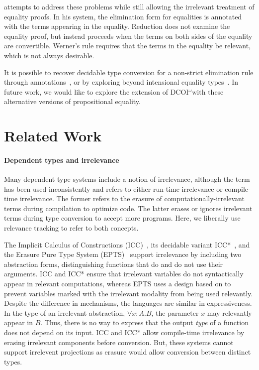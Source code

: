 \documentclass[acmsmall]{acmart}
\makeatletter
\theoremstyle{linked}
\theoremstyle{deflinked}
\theoremstyle{acmdefinition}
\newcommand{\name}{\texorpdfstring{DCOI$^{\omega}$\@\xspace}{DCOI-omega}}
\makeatother
\begin{document}
\citet{werner:proofirrel} attempts to address these problems while still
allowing the irrelevant treatment of equality proofs. In his system, the
elimination form for equalities is annotated with the terms appearing
in the equality. Reduction does not examine the equality proof,
but instead proceeds when the terms on both sides of the equality are convertible.
Werner's rule requires that the terms in the equality be relevant, which is
not always desirable.

It is possible to recover decidable type conversion for a non-strict
elimination rule through annotations~\citep{liu:dependently}, or by exploring
beyond intensional equality types~\citep{pujet:ttobs}. In future work, we
would like to explore the extension of \name with these alternative versions
of propositional equality.

\section{Related Work}

\paragraph{Dependent types and irrelevance}
\label{sec:discuss-irrel}

Many dependent type systems include a notion of irrelevance, although the term
has been used inconsistently and refers to either run-time irrelevance or
compile-time irrelevance. The former refers to the erasure of
computationally-irrelevant terms during compilation to optimize code.
The latter erases or ignores irrelevant terms during type conversion to accept
more programs. Here, we liberally use relevance tracking to refer to both
concepts.

The Implicit Calculus of Constructions (ICC)~\citep{miquel:icc}, its decidable
variant ICC*~\citep{barras:icc}, and the Erasure Pure Type System
(EPTS)~\citep{mishra:erasure} support irrelevance by including two abstraction
forms, distinguishing functions that do and do not use their arguments.  ICC
and ICC* ensure that irrelevant variables do not syntactically appear in
relevant computations, whereas EPTS uses a design based on
\citet{pfenning:modal} to prevent variables marked with the irrelevant
modality from being used relevantly.  Despite the difference in mechanisms,
the languages are similar in expressiveness. In the type of an irrelevant
abstraction, $\forall x\!\!:\!\!A.B$, the parameter $x$ may relevantly
appear in $B$. Thus, there is no way to express that the output \emph{type}
of a function does not depend on its input.  ICC and ICC* allow
compile-time irrelevance by erasing irrelevant components before
conversion. But, these systems cannot support irrelevent projections
as erasure would allow conversion between distinct types.
\end{document}
